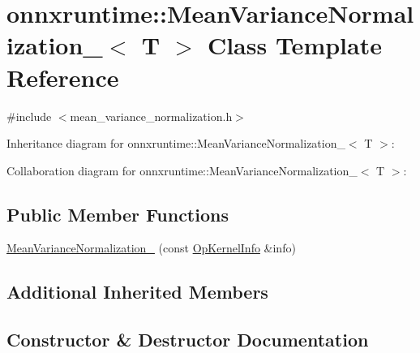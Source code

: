 \hypertarget{classonnxruntime_1_1MeanVarianceNormalization__1}{}\section{onnxruntime\+:\+:Mean\+Variance\+Normalization\+\_$<$ T $>$ Class Template Reference}
\label{classonnxruntime_1_1MeanVarianceNormalization__1}


{\ttfamily \#include $<$mean\+\_\+variance\+\_\+normalization.\+h$>$}



Inheritance diagram for onnxruntime\+:\+:Mean\+Variance\+Normalization\+\_$<$ T $>$\+:


Collaboration diagram for onnxruntime\+:\+:Mean\+Variance\+Normalization\+\_$<$ T $>$\+:
\subsection*{Public Member Functions}
\begin{DoxyCompactItemize}
\item 
\mbox{\hyperlink{classonnxruntime_1_1MeanVarianceNormalization__1_af5917a21aff514c7ae436026425d5421}{Mean\+Variance\+Normalization\+\_}} (const \mbox{\hyperlink{classonnxruntime_1_1OpKernelInfo}{Op\+Kernel\+Info}} \&info)
\end{DoxyCompactItemize}
\subsection*{Additional Inherited Members}


\subsection{Constructor \& Destructor Documentation}
\mbox{\label{classonnxruntime_1_1MeanVarianceNormalization__1_af5917a21aff514c7ae436026425d5421}} 
